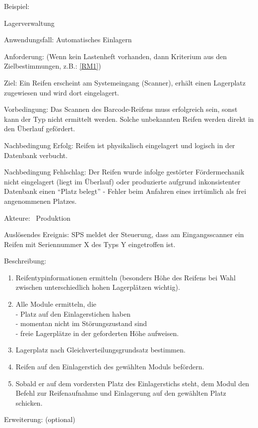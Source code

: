 Beispiel:\\
\begin{function}{10}{Lagerverwaltung}
\item[Anwendungsfall:] Automatisches Einlagern
\item[Anforderung:]  (Wenn kein Lastenheft vorhanden, dann Kriterium aus den Zielbestimmungen, z.B.: \ref{RM1})
\item[Ziel:] Ein Reifen erscheint am Systemeingang (Scanner), erhält einen Lagerplatz
zugewiesen und wird dort eingelagert.
\item[Vorbedingung:] Das Scannen des Barcode-Reifens muss erfolgreich sein, sonst kann
der Typ nicht ermittelt werden. Solche unbekannten Reifen werden direkt in den
Überlauf gefördert.
\item[Nachbedingung Erfolg:] Reifen ist physikalisch eingelagert und logisch in der
Datenbank verbucht.
\item[Nachbedingung Fehlschlag:] Der Reifen wurde infolge gestörter Fördermechanik
nicht eingelagert (liegt im Überlauf) oder produzierte aufgrund inkonsistenter
Datenbank einen "`Platz belegt"' - Fehler beim Anfahren eines irrtümlich
als frei angenommenen Platzes.
\item[Akteure:] ~Produktion
\item[Auslösendes Ereignis:] SPS meldet der Steuerung, dass am Eingangsscanner ein
Reifen mit Seriennummer X des Typs Y eingetroffen ist.
\item[Beschreibung:] ~
\begin{enumerate}
  \item Reifentypinformationen ermitteln (besonders Höhe des Reifens bei Wahl zwischen unterschiedlich hohen Lagerplätzen wichtig).
  \item Alle Module ermitteln, die\\
-  Platz auf den Einlagerstichen haben\\
-  momentan nicht im Störungszustand sind\\
-  freie Lagerplätze in der geforderten Höhe aufweisen.
  \item Lagerplatz nach Gleichverteilungsgrundsatz bestimmen.
  \item Reifen auf den Einlagerstich des gewählten Moduls befördern.
  \item Sobald er auf dem vordersten Platz des Einlagerstichs steht, dem Modul den Befehl zur Reifenaufnahme und Einlagerung auf den gewählten Platz schicken.
\end{enumerate}
\item[Erweiterung:] (optional)\\

\end{function}
